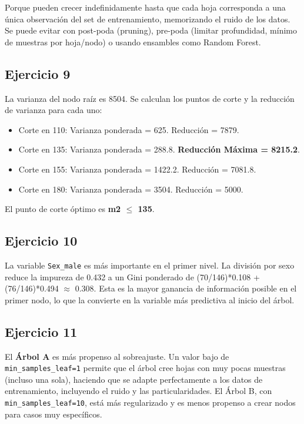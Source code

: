 \documentclass[12pt]{article}
\begin{document}
Porque pueden crecer indefinidamente hasta que cada hoja corresponda a una única observación del set de entrenamiento, memorizando el ruido de los datos. Se puede evitar con post-poda (pruning), pre-poda (limitar profundidad, mínimo de muestras por hoja/nodo) o usando ensambles como Random Forest.

\subsection{Ejercicio 9}
  
La varianza del nodo raíz es 8504. Se calculan los puntos de corte y la reducción de varianza para cada uno:
\begin{itemize}
  \item Corte en 110: Varianza ponderada = 625. Reducción = 7879.
  \item Corte en 135: Varianza ponderada = 288.8. \textbf{Reducción Máxima = 8215.2}.
  \item Corte en 155: Varianza ponderada = 1422.2. Reducción = 7081.8.
  \item Corte en 180: Varianza ponderada = 3504. Reducción = 5000.
\end{itemize}
El punto de corte óptimo es \textbf{m2 \(\leq\) 135}.

\subsection{Ejercicio 10}

La variable \texttt{Sex\_male} es más importante en el primer nivel. La división por sexo reduce la impureza de 0.432 a un Gini ponderado de (70/146)*0.108 + (76/146)*0.494 \(\approx\) 0.308. Esta es la mayor ganancia de información posible en el primer nodo, lo que la convierte en la variable más predictiva al inicio del árbol.

\subsection{Ejercicio 11}

El \textbf{Árbol A} es más propenso al sobreajuste. Un valor bajo de \texttt{min\_samples\_leaf=1} permite que el árbol cree hojas con muy pocas muestras (incluso una sola), haciendo que se adapte perfectamente a los datos de entrenamiento, incluyendo el ruido y las particularidades. El Árbol B, con \texttt{min\_samples\_leaf=10}, está más regularizado y es menos propenso a crear nodos para casos muy específicos.
\end{document}
